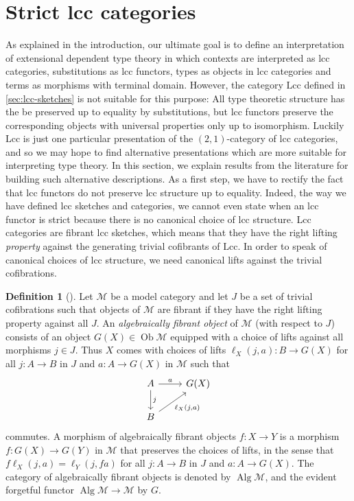 \documentclass[a4paper]{article}
\theoremstyle{remark}
\theoremstyle{definition}
\newtheorem{definition}[theorem]{Definition}
\begin{document}
\section{Strict lcc categories}
\label{sec:slcc}

As explained in the introduction, our ultimate goal is to define an interpretation of extensional dependent type theory in which contexts are interpreted as lcc categories, substitutions as lcc functors, types as objects in lcc categories and terms as morphisms with terminal domain.
However, the category $\mathrm{Lcc}$ defined in \ref{sec:lcc-sketches} is not suitable for this purpose:
All type theoretic structure has the be preserved up to equality by substitutions, but lcc functors preserve the corresponding objects with universal properties only up to isomorphism.
Luckily $\mathrm{Lcc}$ is just one particular presentation of the $(2, 1)$-category of lcc categories, and so we may hope to find alternative presentations which are more suitable for interpreting type theory.
In this section, we explain results from the literature for building such alternative descriptions.
As a first step, we have to rectify the fact that lcc functors do not preserve lcc structure up to equality.
Indeed, the way we have defined lcc sketches and categories, we cannot even state when an lcc functor is strict because there is no canonical choice of lcc structure.
Lcc categories are fibrant lcc sketches, which means that they have the right lifting \emph{property} against the generating trivial cofibrants of $\mathrm{Lcc}$.
In order to speak of canonical choices of lcc structure, we need canonical lifts against the trivial cofibrations.

\begin{definition}[\cite{algebraic-models}]
  \label{def:algebraically-fibrant-objects}
  Let $\mathcal{M}$ be a model category and let $J$ be a set of trivial cofibrations such that objects of $\mathcal{M}$ are fibrant if they have the right lifting property against all $J$.
  An \emph{algebraically fibrant object} of $\mathcal{M}$ (with respect to $J$) consists of an object $G(X) \in \operatorname{Ob} \mathcal{M}$ equipped with a choice of lifts against all morphisms $j \in J$.
  Thus $X$ comes with choices of lifts $\ell_X({j, a}) : B \rightarrow G(X)$ for all $j : A \rightarrow B$ in $J$ and $a : A \rightarrow G(X)$ in $\mathcal{M}$ such that
  \begin{equation}
    \begin{tikzcd}
      A \arrow[d, "j"] \arrow[r, "a"] & G(X) \\
      B \arrow[ur, "{\ell_X(j, a)}"']
    \end{tikzcd}
  \end{equation}
  commutes.
  A morphism of algebraically fibrant objects $f : X \rightarrow Y$ is a morphism $f : G(X) \rightarrow G(Y)$ in $\mathcal{M}$ that preserves the choices of lifts, in the sense that $f \ell_X(j, a) = \ell_Y(j, fa)$ for all $j : A \rightarrow B$ in $J$ and $a : A \rightarrow G(X)$.
  The category of algebraically fibrant objects is denoted by $\operatorname{Alg} \mathcal{M}$, and the evident forgetful functor $\operatorname{Alg} \mathcal{M} \rightarrow \mathcal{M}$ by $G$.
\end{definition}
\end{document}
